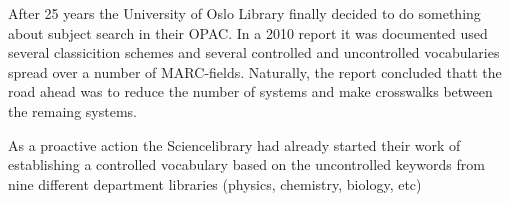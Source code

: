 After 25 years the University of Oslo  Library finally decided to do something about subject search in their OPAC. In a 2010 report it was documented  used several classicition schemes and several controlled and uncontrolled vocabularies spread over a number of MARC-fields. Naturally, the report concluded thatt the  road ahead  was to reduce the number of systems and make crosswalks between the remaing systems.

As a proactive action the Sciencelibrary had already started their work of establishing a  controlled vocabulary based on the uncontrolled keywords from nine different  department libraries (physics, chemistry, biology, etc)